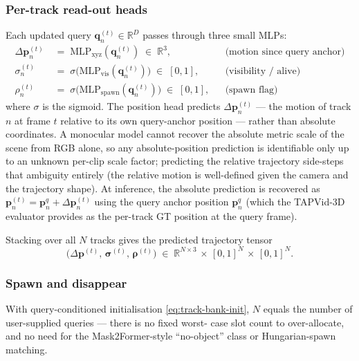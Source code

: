 \documentclass[11pt,a4paper]{article}
\begin{document}
\subsubsection{Per-track read-out heads}
\label{sec:track-heads}

Each updated query $\bm{q}_n^{(t)} \in \mathbb{R}^{D}$ passes through
three small MLPs:
\begin{align}
  \Delta\bm{p}_n^{(t)} &\;=\; \mathrm{MLP}_{\text{xyz}}(\bm{q}_n^{(t)}) \;\in\; \mathbb{R}^{3},
  & &\text{(motion since query anchor)}\\
  \sigma_n^{(t)} &\;=\; \sigma\!\bigl(\mathrm{MLP}_{\text{vis}}(\bm{q}_n^{(t)})\bigr) \;\in\; [0, 1],
  & &\text{(visibility / alive)}\\
  \rho_n^{(t)}   &\;=\; \sigma\!\bigl(\mathrm{MLP}_{\text{spawn}}(\bm{q}_n^{(t)})\bigr) \;\in\; [0, 1],
  & &\text{(spawn flag)}
\end{align}
where $\sigma$ is the sigmoid. The position head predicts
$\Delta\bm{p}_n^{(t)}$ — the motion of track $n$ at frame $t$ relative
to its own query-anchor position — rather than absolute coordinates.
A monocular model cannot recover the absolute metric scale of the
scene from RGB alone, so any absolute-position prediction is
identifiable only up to an unknown per-clip scale factor; predicting
the relative trajectory side-steps that ambiguity entirely (the
relative motion is well-defined given the camera and the trajectory
shape). At inference, the absolute prediction is recovered as
$\bm{p}_n^{(t)} = \bm{p}_n^{q} + \Delta\bm{p}_n^{(t)}$ using the query
anchor position $\bm{p}_n^{q}$ (which the TAPVid-3D evaluator provides
as the per-track GT position at the query frame).

Stacking over all $N$ tracks gives the predicted trajectory tensor
\begin{equation}
  \bigl(\Delta\bm{p}^{(t)},\,\bm{\sigma}^{(t)},\,\bm{\rho}^{(t)}\bigr)
  \;\in\; \mathbb{R}^{N\times 3}\,\times\,[0,1]^{N}\,\times\,[0,1]^{N}.
\end{equation}

\subsubsection{Spawn and disappear}
\label{sec:track-spawn}

With query-conditioned initialisation \eqref{eq:track-bank-init}, $N$
equals the number of user-supplied queries — there is no fixed worst-
case slot count to over-allocate, and no need for the Mask2Former-style
``no-object'' class or Hungarian-spawn matching.
\end{document}

